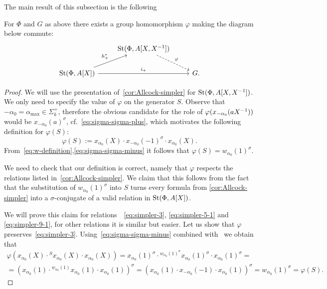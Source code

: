 The main result of this subsection is the following
\begin{prop} \label{prop:rel-poly-Laurent}
    For $\Phi$ and $G$ as above there exists a group homomorphism $\varphi$ making the diagram below commute:
    \[\begin{tikzcd} & \St(\Phi, A[X, X\inv]) \arrow[rd, dashrightarrow, "\varphi"] & \\
    \St(\Phi, A[X]) \arrow{ru}{h_+^*} \arrow{rr}{i_+} & & G.
    \end{tikzcd}\]
\end{prop}
\begin{proof}
 We will use the presentation of~\cref{cor:Allcock-simpler} for $\operatorname{St}(\Phi, A[X, X^{-1}])$.
 We only need to specify the value of $\varphi$ on the generator $S$.
 Observe that $-\alpha_0 = \alpha_{\max} \in \Sigma_k^+$, therefore the obvious candidate for the role of $\varphi(x_{-\alpha_0}(aX^{-1}))$ would be $x_{-\alpha_0}(a)^\sigma$, cf.~\eqref{eq:sigma-sigma-plus},
 which motivates the following definition for $\varphi(S)$:
 \[\varphi(S) := x_{\alpha_0}(X) \cdot x_{-\alpha_0}(-1)^\sigma \cdot x_{\alpha_0}(X).\]
 From~\eqref{eq:w-definition},\eqref{eq:sigma-sigma-minus} it follows that $\varphi(S) = w_{\alpha_0}(1)^\sigma$.

 We need to check that our definition is correct, namely that $\varphi$ respects the relations listed in~\cref{cor:Allcock-simpler}.
 We claim that this follows from the fact that the substitution of $w_{\alpha_0}(1)^\sigma$ into $S$ turns every formula from \cref{cor:Allcock-simpler}
     into a $\sigma$-conjugate of a valid relation in $\operatorname{St}(\Phi, A[X])$.

 We will prove this claim for relations~~\eqref{eq:simpler-3}, \eqref{eq:simpler-5-1} and \eqref{eq:simpler-9-1}, for other relations it is similar but easier.
 Let us show that $\varphi$ preserves~\eqref{eq:simpler-3}.
 Using~\eqref{eq:sigma-sigma-minus} combined with~\cite[Lemma~5.1b]{Ma69} we obtain that
 \begin{multline*}
     \varphi(x_{\alpha_0}(X) \cdot {}^{S} x_{\alpha_0}(X) \cdot x_{\alpha_0}(X)) = x_{\alpha_0}(1)^\sigma \cdot {}^{w_{\alpha_0}(1)^\sigma} x_{\alpha_0}(1)^\sigma \cdot x_{\alpha_0}(1)^\sigma = \\
     = \left( x_{\alpha_0}(1) \cdot {}^{w_{\alpha_0}(1)} x_{\alpha_0}(1) \cdot x_{\alpha_0}(1)\right)^\sigma = \left(x_{\alpha_0}(1) \cdot x_{-\alpha_0}(-1) \cdot x_{\alpha_0}(1)\right)^\sigma = w_{\alpha_0}(1)^\sigma = \varphi(S).
 \end{multline*}


\end{proof}
